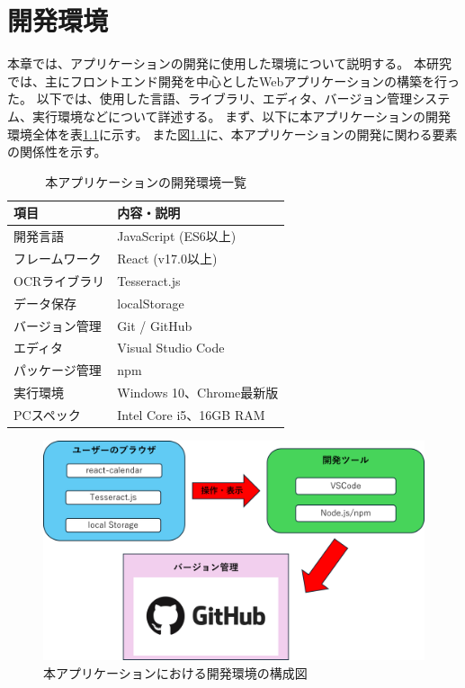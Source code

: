 \documentclass[main]{subfiles}
\begin{document}
\chapter{開発環境}
\label{cha:environment}
本章では、アプリケーションの開発に使用した環境について説明する。
本研究では、主にフロントエンド開発を中心としたWebアプリケーションの構築を行った。
以下では、使用した言語、ライブラリ、エディタ、バージョン管理システム、実行環境などについて詳述する。
まず、以下に本アプリケーションの開発環境全体を表\ref{tab:dev_environment}に示す。
また図\ref{fig:dev_environment}に、本アプリケーションの開発に関わる要素の関係性を示す。

\begin{table}[htbp]
\centering
\caption{本アプリケーションの開発環境一覧}
\label{tab:dev_environment}
\begin{tabular}{ll}
\hline
項目 & 内容・説明 \\
\hline
開発言語 & JavaScript (ES6以上) \\
フレームワーク & React (v17.0以上) \\
OCRライブラリ & Tesseract.js \\
データ保存 & localStorage \\
バージョン管理 & Git / GitHub \\
エディタ & Visual Studio Code \\
パッケージ管理 & npm \\
実行環境 & Windows 10、Chrome最新版 \\
PCスペック & Intel Core i5、16GB RAM \\
\hline
\end{tabular}
\end{table}

\begin{figure}[htbp]
\centering
\includegraphics[width=0.9\linewidth]{../figures/environment.png}
\caption{本アプリケーションにおける開発環境の構成図}
\label{fig:dev_environment}
\end{figure}
\end{document}
